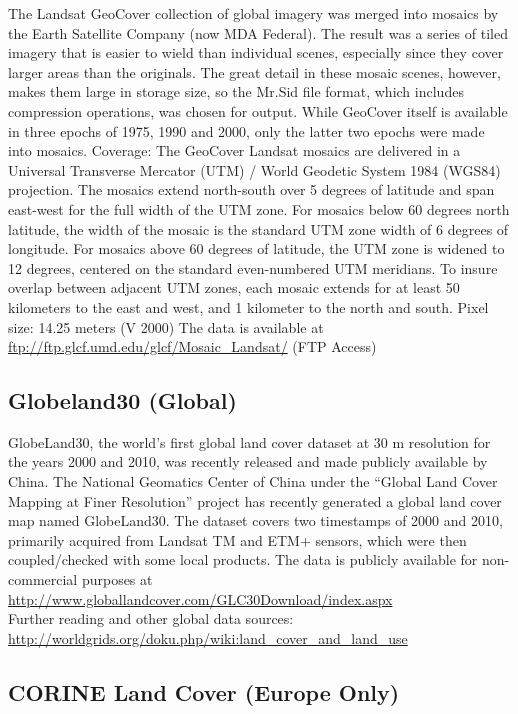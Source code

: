 \documentclass[10pt,b5paper,]{book}
\theoremstyle{definition}
\theoremstyle{definition}
\theoremstyle{definition}
\theoremstyle{remark}
\begin{document}
The Landsat GeoCover collection of global imagery was merged into
mosaics by the Earth Satellite Company (now MDA Federal). The result was
a series of tiled imagery that is easier to wield than individual
scenes, especially since they cover larger areas than the originals. The
great detail in these mosaic scenes, however, makes them large in
storage size, so the Mr.Sid file format, which includes compression
operations, was chosen for output. While GeoCover itself is available in
three epochs of 1975, 1990 and 2000, only the latter two epochs were
made into mosaics. Coverage: The GeoCover Landsat mosaics are delivered
in a Universal Transverse Mercator (UTM) / World Geodetic System 1984
(WGS84) projection. The mosaics extend north-south over 5 degrees of
latitude and span east-west for the full width of the UTM zone. For
mosaics below 60 degrees north latitude, the width of the mosaic is the
standard UTM zone width of 6 degrees of longitude. For mosaics above 60
degrees of latitude, the UTM zone is widened to 12 degrees, centered on
the standard even-numbered UTM meridians. To insure overlap between
adjacent UTM zones, each mosaic extends for at least 50 kilometers to
the east and west, and 1 kilometer to the north and south. Pixel size:
14.25 meters (V 2000) The data is available at
\url{ftp://ftp.glcf.umd.edu/glcf/Mosaic_Landsat/} (FTP Access)

\hypertarget{globeland30-global}{%
\subsection{Globeland30 (Global)}\label{globeland30-global}}

GlobeLand30, the world's first global land cover dataset at 30 m
resolution for the years 2000 and 2010, was recently released and made
publicly available by China. The National Geomatics Center of China
under the ``Global Land Cover Mapping at Finer Resolution'' project has
recently generated a global land cover map named GlobeLand30. The
dataset covers two timestamps of 2000 and 2010, primarily acquired from
Landsat TM and ETM+ sensors, which were then coupled/checked with some
local products. The data is publicly available for non-commercial
purposes at
\url{http://www.globallandcover.com/GLC30Download/index.aspx}\\
Further reading and other global data sources:
\url{http://worldgrids.org/doku.php/wiki:land_cover_and_land_use}

\hypertarget{corine-land-cover-europe-only}{%
\subsection{CORINE Land Cover (Europe
Only)}\label{corine-land-cover-europe-only}}
\end{document}
